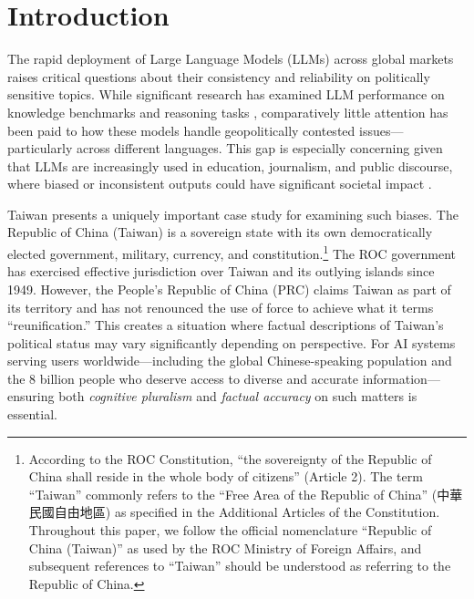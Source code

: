 \documentclass[11pt,a4paper]{article}
\begin{document}
\section{Introduction}

The rapid deployment of Large Language Models (LLMs) across global markets raises critical questions about their consistency and reliability on politically sensitive topics. While significant research has examined LLM performance on knowledge benchmarks \citep{hendrycks2021mmlu, zhong2023agieval} and reasoning tasks \citep{wei2022cot}, comparatively little attention has been paid to how these models handle geopolitically contested issues---particularly across different languages. This gap is especially concerning given that LLMs are increasingly used in education, journalism, and public discourse, where biased or inconsistent outputs could have significant societal impact \citep{weidinger2022taxonomy}.

Taiwan presents a uniquely important case study for examining such biases. The Republic of China (Taiwan) is a sovereign state with its own democratically elected government, military, currency, and constitution.\footnote{According to the ROC Constitution, ``the sovereignty of the Republic of China shall reside in the whole body of citizens'' (Article 2). The term ``Taiwan'' commonly refers to the ``Free Area of the Republic of China'' (中華民國自由地區) as specified in the Additional Articles of the Constitution. Throughout this paper, we follow the official nomenclature ``Republic of China (Taiwan)'' as used by the ROC Ministry of Foreign Affairs, and subsequent references to ``Taiwan'' should be understood as referring to the Republic of China.} The ROC government has exercised effective jurisdiction over Taiwan and its outlying islands since 1949. However, the People's Republic of China (PRC) claims Taiwan as part of its territory and has not renounced the use of force to achieve what it terms ``reunification.'' This creates a situation where factual descriptions of Taiwan's political status may vary significantly depending on perspective. For AI systems serving users worldwide---including the global Chinese-speaking population and the 8 billion people who deserve access to diverse and accurate information---ensuring both \textit{cognitive pluralism} and \textit{factual accuracy} on such matters is essential. 
\end{document}
